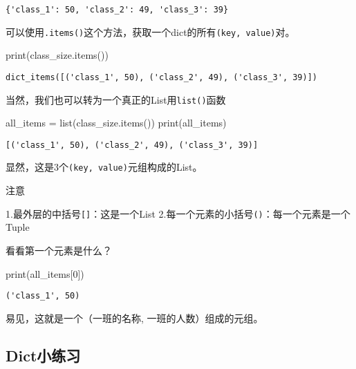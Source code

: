 \documentclass[
  letterpaper,
  DIV=11,
  numbers=noendperiod]{scrreprt}
\newenvironment{Shaded}{\begin{snugshade}}{\end{snugshade}}
\newcommand{\BuiltInTok}[1]{\textcolor[rgb]{0.00,0.23,0.31}{#1}}
\newcommand{\DecValTok}[1]{\textcolor[rgb]{0.68,0.00,0.00}{#1}}
\newcommand{\NormalTok}[1]{\textcolor[rgb]{0.00,0.23,0.31}{#1}}
\newcommand{\OperatorTok}[1]{\textcolor[rgb]{0.37,0.37,0.37}{#1}}
\begin{document}
\begin{verbatim}
{'class_1': 50, 'class_2': 49, 'class_3': 39}
\end{verbatim}

可以使用\texttt{.items()}这个方法，获取一个dict的所有\texttt{(key,\ value)}对。

\begin{Shaded}
\begin{Highlighting}[]
\BuiltInTok{print}\NormalTok{(class\_size.items())}
\end{Highlighting}
\end{Shaded}

\begin{verbatim}
dict_items([('class_1', 50), ('class_2', 49), ('class_3', 39)])
\end{verbatim}

当然，我们也可以转为一个真正的List用\texttt{list()}函数

\begin{Shaded}
\begin{Highlighting}[]
\NormalTok{all\_items }\OperatorTok{=} \BuiltInTok{list}\NormalTok{(class\_size.items())}
\BuiltInTok{print}\NormalTok{(all\_items)}
\end{Highlighting}
\end{Shaded}

\begin{verbatim}
[('class_1', 50), ('class_2', 49), ('class_3', 39)]
\end{verbatim}

显然，这是3个\texttt{(key,\ value)}元组构成的List。

注意

1.最外层的中括号\texttt{{[}{]}}：这是一个List
2.每一个元素的小括号\texttt{()}：每一个元素是一个Tuple

看看第一个元素是什么？

\begin{Shaded}
\begin{Highlighting}[]
\BuiltInTok{print}\NormalTok{(all\_items[}\DecValTok{0}\NormalTok{])}
\end{Highlighting}
\end{Shaded}

\begin{verbatim}
('class_1', 50)
\end{verbatim}

易见，这就是一个（一班的名称, 一班的人数）组成的元组。

\hypertarget{dictux5c0fux7ec3ux4e60}{%
\subsection{Dict小练习}\label{dictux5c0fux7ec3ux4e60}}
\end{document}
